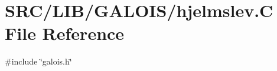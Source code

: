 \hypertarget{hjelmslev_8_c}{}\section{S\+R\+C/\+L\+I\+B/\+G\+A\+L\+O\+I\+S/hjelmslev.C File Reference}
\label{hjelmslev_8_c}
{\ttfamily \#include \char`\"{}galois.\+h\char`\"{}}\newline
